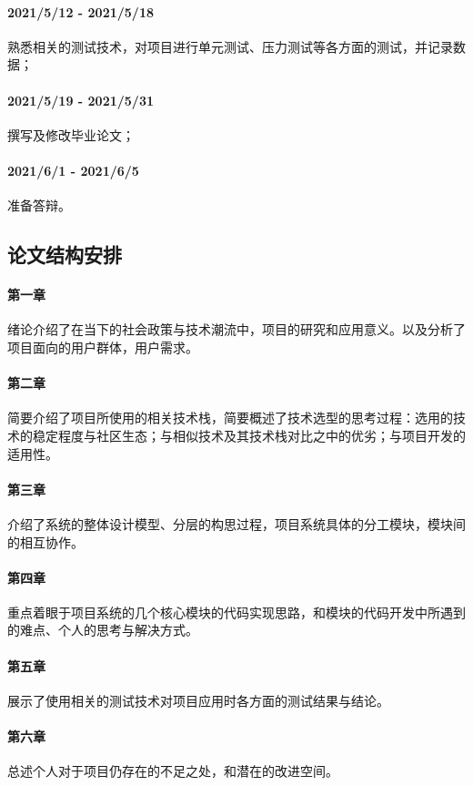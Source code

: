 \paragraph{2021/5/12 - 2021/5/18} 熟悉相关的测试技术，对项目进行单元测试、压力测试等各方面的测试，并记录数据；
\paragraph{2021/5/19 - 2021/5/31} 撰写及修改毕业论文；
\paragraph{2021/6/1 - 2021/6/5} 准备答辩。

\subsection{论文结构安排}
\paragraph{第一章}绪论介绍了在当下的社会政策与技术潮流中，项目的研究和应用意义。以及分析了项目面向的用户群体，用户需求。

\paragraph{第二章}简要介绍了项目所使用的相关技术栈，简要概述了技术选型的思考过程：选用的技术的稳定程度与社区生态；与相似技术及其技术栈对比之中的优劣；与项目开发的适用性。

\paragraph{第三章}介绍了系统的整体设计模型、分层的构思过程，项目系统具体的分工模块，模块间的相互协作。

\paragraph{第四章}重点着眼于项目系统的几个核心模块的代码实现思路，和模块的代码开发中所遇到的难点、个人的思考与解决方式。

\paragraph{第五章}展示了使用相关的测试技术对项目应用时各方面的测试结果与结论。

\paragraph{第六章}总述个人对于项目仍存在的不足之处，和潜在的改进空间。